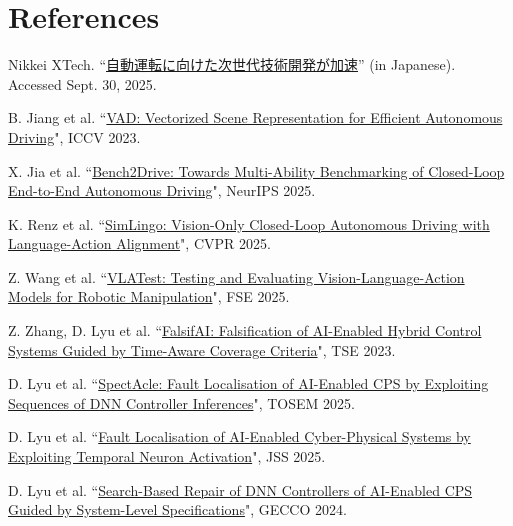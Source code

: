 \documentclass[12pt,a4paper]{article}
\begin{document}
\section*{References} 
\begin{enumerate}[label={[\arabic*]}, leftmargin=*] 
  \item \hypertarget{paper1}{}Nikkei XTech. ``\href{https://xtech.nikkei.com/atcl/nxt/column/18/03080/012300002/}{自動運転に向けた次世代技術開発が加速}'' (in Japanese). Accessed Sept. 30, 2025.
  \item \hypertarget{paper2}{}B. Jiang et al. ``\href{https://openaccess.thecvf.com/content/ICCV2023/html/Jiang_VAD_Vectorized_Scene_Representation_for_Efficient_Autonomous_Driving_ICCV_2023_paper.html}{VAD: Vectorized Scene Representation for Efficient Autonomous Driving}", ICCV 2023.
  \item \hypertarget{paper3}{}X. Jia et al. ``\href{https://dl.acm.org/doi/10.5555/3737916.3737941}{Bench2Drive: Towards Multi-Ability Benchmarking of Closed-Loop End-to-End Autonomous Driving}", NeurIPS 2025.
  \item \hypertarget{paper4}{}K. Renz et al. ``\href{https://www.computer.org/csdl/proceedings-article/cvpr/2025/436400l993/299arUT3bQA}{SimLingo: Vision-Only Closed-Loop Autonomous Driving with Language-Action Alignment}", CVPR 2025.
  \item \hypertarget{paper5}{}Z. Wang et al. ``\href{https://dl.acm.org/doi/10.1145/3729343}{VLATest: Testing and Evaluating Vision-Language-Action Models for Robotic Manipulation}", FSE 2025.
  \item Z. Zhang, D. Lyu et al. \hypertarget{paper6}{}``\href{https://ieeexplore.ieee.org/document/9844247}{FalsifAI: Falsification of AI-Enabled Hybrid Control Systems Guided by Time-Aware Coverage Criteria}", TSE 2023.
  \item \hypertarget{paper7}{}D. Lyu et al. ``\href{https://dl.acm.org/doi/10.1145/3705307}{SpectAcle: Fault Localisation of AI-Enabled CPS by Exploiting Sequences of DNN Controller Inferences}", TOSEM 2025.
  \item \hypertarget{paper8}{}D. Lyu et al. ``\href{https://www.sciencedirect.com/science/article/abs/pii/S0164121225001438}{Fault Localisation of AI-Enabled Cyber-Physical Systems by Exploiting Temporal Neuron Activation}", JSS 2025.
  \item \hypertarget{paper9}{}D. Lyu et al. ``\href{https://dl.acm.org/doi/10.1145/3638529.3654078}{Search-Based Repair of DNN Controllers of AI-Enabled CPS Guided by System-Level Specifications}", GECCO 2024.
 \end{enumerate}
\end{document}
